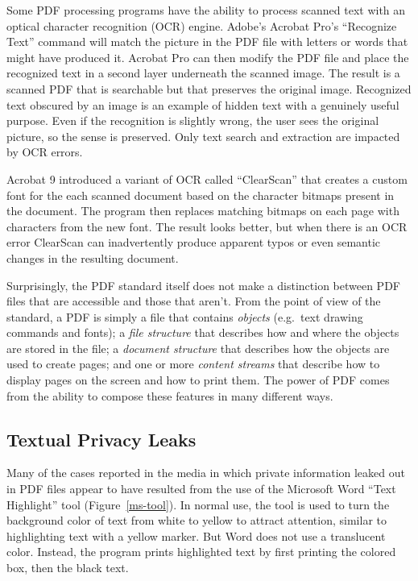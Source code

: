 \documentclass{article}
\begin{document}
Some PDF processing programs have the ability to process scanned text
with an optical character recognition (OCR) engine. Adobe's Acrobat
Pro's ``Recognize Text'' command will match  the picture in
the PDF file with letters or words that might have produced
it. Acrobat Pro can then modify the PDF file and place the recognized
text in a second layer underneath the scanned image. The result is a
scanned PDF  that is searchable but that preserves the
original image. Recognized text obscured by an image is an example of hidden text with
a genuinely useful purpose. Even if the recognition is slightly wrong, the
user sees the original picture, so the sense is preserved. Only text
search and extraction are impacted by OCR errors.

Acrobat 9 introduced a variant of OCR called
``ClearScan'' that creates a custom font for the each scanned
document based on the character bitmaps present in the document. The
program then replaces matching bitmaps on each page with characters
from the new font.  The result looks better, but when there is an OCR
error ClearScan can inadvertently produce apparent typos or even semantic changes in the resulting
document.

Surprisingly, the PDF standard itself does not make a distinction
between PDF files that are accessible and those that aren't. From the
point of view of the standard, a PDF is simply a file that contains
\emph{objects} (e.g.\ text drawing commands and fonts); a \emph{file
  structure} that describes how and where the objects are stored in
the file; a \emph{document structure} that describes how the objects
are used to create pages; and one or more \emph{content streams} that
describe how to display pages on the screen and how to print them.  The
power of  PDF comes from the ability to compose  these features in  many different ways. 


\subsection{Textual Privacy Leaks}

Many of the cases reported in the media in which private information
leaked out in PDF files appear to have resulted from the use of the
Microsoft Word ``Text Highlight'' tool (Figure~\ref{ms-tool}).  In
normal use, the tool is used to turn the background color of text from
white to yellow to attract
attention, similar to highlighting text with a
yellow marker. But Word does not use a translucent
color. Instead, the program prints highlighted text by first printing
the colored box, then the black text.
\end{document}

